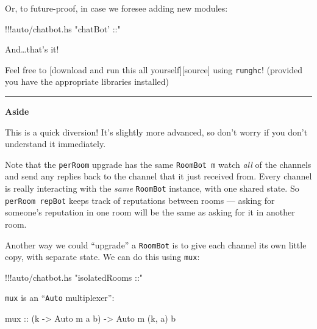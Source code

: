 \documentclass[]{article}
\newenvironment{Shaded}{}{}
\newcommand{\DataTypeTok}[1]{\textcolor[rgb]{0.56,0.13,0.00}{{#1}}}
\newcommand{\StringTok}[1]{\textcolor[rgb]{0.25,0.44,0.63}{{#1}}}
\newcommand{\OtherTok}[1]{\textcolor[rgb]{0.00,0.44,0.13}{{#1}}}
\newcommand{\FunctionTok}[1]{\textcolor[rgb]{0.02,0.16,0.49}{{#1}}}
\newcommand{\NormalTok}[1]{{#1}}
\begin{document}
Or, to future-proof, in case we foresee adding new modules:

\begin{Shaded}
\begin{Highlighting}[]
\FunctionTok{!!!}\NormalTok{auto}\FunctionTok{/}\NormalTok{chatbot}\FunctionTok{.}\NormalTok{hs }\StringTok{"chatBot' ::"}
\end{Highlighting}
\end{Shaded}

And\ldots{}that's it!

Feel free to {[}download and run this all yourself{]}{[}source{]} using
\texttt{runghc}! (provided you have the appropriate libraries installed)

\begin{center}\rule{0.5\linewidth}{\linethickness}\end{center}

\textbf{Aside}

This is a quick diversion! It's slightly more advanced, so don't worry
if you don't understand it immediately.

Note that the \texttt{perRoom} upgrade has the same \texttt{RoomBot\ m}
watch \emph{all} of the channels and send any replies back to the
channel that it just received from. Every channel is really interacting
with the \emph{same} \texttt{RoomBot} instance, with one shared state.
So \texttt{perRoom\ repBot} keeps track of reputations between rooms ---
asking for someone's reputation in one room will be the same as asking
for it in another room.

Another way we could ``upgrade'' a \texttt{RoomBot} is to give each
channel its own little copy, with separate state. We can do this using
\texttt{mux}:

\begin{Shaded}
\begin{Highlighting}[]
\FunctionTok{!!!}\NormalTok{auto}\FunctionTok{/}\NormalTok{chatbot}\FunctionTok{.}\NormalTok{hs }\StringTok{"isolatedRooms ::"}
\end{Highlighting}
\end{Shaded}

\texttt{mux} is an ``\texttt{Auto} multiplexer'':

\begin{Shaded}
\begin{Highlighting}[]
\OtherTok{mux ::} \NormalTok{(k }\OtherTok{->} \DataTypeTok{Auto} \NormalTok{m a b) }\OtherTok{->} \DataTypeTok{Auto} \NormalTok{m (k, a) b}
\end{Highlighting}
\end{Shaded}
\end{document}
